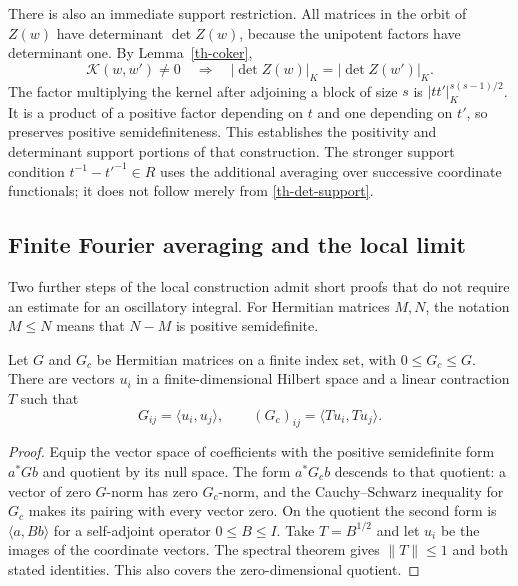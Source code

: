 There is also an immediate support restriction.  All matrices in
the orbit of $Z(w)$ have determinant $\det Z(w)$, because the
unipotent factors have determinant one.  By Lemma~\ref{th-coker},
\begin{equation}\label{th-det-support}
 \mathcal K(w,w')\ne0\quad\Longrightarrow\quad
 |\det Z(w)|_K=|\det Z(w')|_K.
\end{equation}
The factor multiplying the kernel after adjoining a block of size
$s$ is
$|tt'|_K^{s(s-1)/2}$.  It is a product of a positive factor depending
on $t$ and one depending on $t'$, so preserves positive
semidefiniteness.  This establishes the positivity and determinant
support portions of that construction.  The stronger support
condition $t^{-1}-t'^{-1}\in R$ uses the additional averaging over
successive coordinate functionals; it does not follow merely from
\eqref{th-det-support}.

\subsection{Finite Fourier averaging and the local limit}

Two further steps of the local construction admit short proofs that
do not require an estimate for an oscillatory integral.  For Hermitian
matrices $M,N$, the notation $M\le N$ means that $N-M$ is positive
semidefinite.

\begin{lemma}\label{th-cut-contraction}
Let $G$ and $G_c$ be Hermitian matrices on a finite index set, with
$0\le G_c\le G$.  There are vectors $u_i$ in a finite-dimensional
Hilbert space and a linear contraction $T$ such that
\[
 G_{ij}=\langle u_i,u_j\rangle,\qquad
 (G_c)_{ij}=\langle Tu_i,Tu_j\rangle.
\]
\end{lemma}

\begin{proof}
Equip the vector space of coefficients with the positive semidefinite
form $a^*Gb$ and quotient by its null space.  The form $a^*G_cb$
descends to that quotient: a vector of zero $G$-norm has zero
$G_c$-norm, and the Cauchy--Schwarz inequality for $G_c$ makes its
pairing with every vector zero.  On the quotient the second form is
$\langle a,Bb\rangle$ for a self-adjoint operator $0\le B\le I$.
Take $T=B^{1/2}$ and let $u_i$ be the images of the coordinate vectors.
The spectral theorem gives $\|T\|\le1$ and both stated identities.
This also covers the zero-dimensional quotient.
\end{proof}

